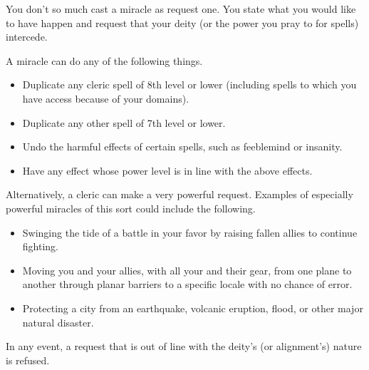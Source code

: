 \begin{spellheader}
\end{spellheader}
\begin{spellcontent}
    \begin{spelltargetinginfo}
    \end{spelltargetinginfo}
    \begin{spelleffects}
        \spelleffect You don't so much cast a miracle as request one. You state what you would like to have happen and request that your deity (or the power you pray to for spells) intercede.
        \par A miracle can do any of the following things.
        \begin{itemize}
            \item Duplicate any cleric spell of 8th level or lower (including spells to which you have access because of your domains). 
            \item Duplicate any other spell of 7th level or lower.
            \item Undo the harmful effects of certain spells, such as feeblemind or insanity.
            \item Have any effect whose power level is in line with the above effects.
        \end{itemize}
        \par Alternatively, a cleric can make a very powerful request. Examples of especially powerful miracles of this sort could include the following.
        \begin{itemize}
            \item Swinging the tide of a battle in your favor by raising fallen allies to continue fighting.
            \item Moving you and your allies, with all your and their gear, from one plane to another through planar barriers to a specific locale with no chance of error.
            \item Protecting a city from an earthquake, volcanic eruption, flood, or other major natural disaster.
        \end{itemize}
        \par In any event, a request that is out of line with the deity's (or alignment's) nature is refused.
    \end{spelleffects}
\end{spellcontent}
